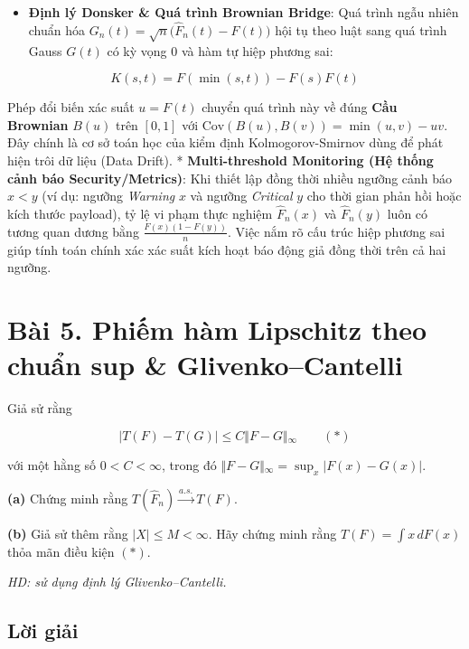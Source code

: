 \documentclass[12pt,a4paper]{article}
\begin{document}
\begin{itemize}

\item
  \textbf{Định lý Donsker \& Quá trình Brownian Bridge}: Quá trình ngẫu nhiên chuẩn hóa \(G_n(t) = \sqrt{n}\big(\widehat{F}_n(t) - F(t)\big)\) hội tụ theo luật sang quá trình Gauss \(G(t)\) có kỳ vọng 0 và hàm tự hiệp phương sai:
\end{itemize}

\[K(s, t) = F(\min(s, t)) - F(s)F(t)\]

Phép đổi biến xác suất \(u = F(t)\) chuyển quá trình này về đúng \textbf{Cầu Brownian} \(B(u)\) trên \([0, 1]\) với \(\text{Cov}(B(u), B(v)) = \min(u, v) - uv\). Đây chính là cơ sở toán học của kiểm định Kolmogorov-Smirnov dùng để phát hiện trôi dữ liệu (Data Drift).
* \textbf{Multi-threshold Monitoring (Hệ thống cảnh báo Security/Metrics)}: Khi thiết lập đồng thời nhiều ngưỡng cảnh báo \(x < y\) (ví dụ: ngưỡng \emph{Warning} \(x\) và ngưỡng \emph{Critical} \(y\) cho thời gian phản hồi hoặc kích thước payload), tỷ lệ vi phạm thực nghiệm \(\widehat{F}_n(x)\) và \(\widehat{F}_n(y)\) luôn có tương quan dương bằng \(\frac{F(x)(1 - F(y))}{n}\). Việc nắm rõ cấu trúc hiệp phương sai giúp tính toán chính xác xác suất kích hoạt báo động giả đồng thời trên cả hai ngưỡng.

\section{Bài 5. Phiếm hàm Lipschitz theo chuẩn sup \& Glivenko--Cantelli}\label{buxe0i-5.-phiux1ebfm-huxe0m-lipschitz-theo-chuux1ea9n-sup-glivenkocantelli}

\begin{debai}

Giả sử rằng

\[\vert{}T(F) - T(G)\vert{} \le C \Vert{}F - G\Vert{}_\infty \qquad (*)\]

với một hằng số \(0 < C < \infty\), trong đó \(\Vert{}F - G\Vert{}_\infty = \sup_x \vert{}F(x) - G(x)\vert{}\).

\textbf{(a)} Chứng minh rằng \(T(\widehat{F}_n) \xrightarrow{a.s.} T(F)\).

\textbf{(b)} Giả sử thêm rằng \(\vert{}X\vert{} \le M < \infty\). Hãy chứng minh rằng \(T(F) = \int x \, dF(x)\) thỏa mãn điều kiện \((*)\).

\emph{HD: sử dụng định lý Glivenko--Cantelli.}

\end{debai}
\subsection*{Lời giải}
\end{document}
